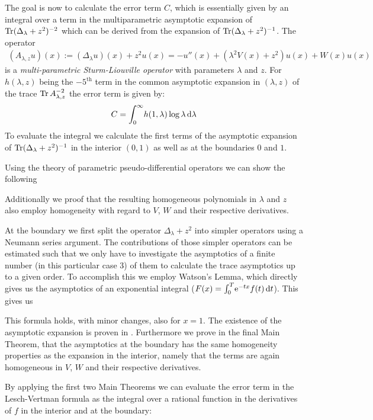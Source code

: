 The goal is now to calculate the error term $C$, which is essentially given by
an integral over a term in the multiparametric asymptotic expansion of
$\Tr(\Delta_\lambda + z^2)^{-2}$ which can be derived from the expansion of
$\Tr(\Delta_\lambda + z^2)^{-1}$. The operator
\begin{align*}
  (A_{\lambda,z}u)(x) := (\Delta_\lambda u)(x) + z^2 u(x)
           = -u''(x) + (\lambda^2 V(x) + z^2) u(x) + W(x) u(x)
\end{align*}
is a \emph{multi-parametric Sturm-Liouville operator} with parameters $\lambda$
and $z$. For $h(\lambda,z)$ being the $-5^{\text{th}}$ term in the common
asymptotic expansion in $(\lambda,z)$ of the trace $\Tr A_{\lambda,z}^{-2}$ the
error term is given by:
\begin{align*}
  C = \Integ[\infty]{0}{\lambda}{h(1,\lambda)\log\lambda}
\end{align*}
To evaluate the integral we calculate the first terms of the asymptotic
expansion of $\Tr(\Delta_\lambda + z^2)^{-1}$ in the interior $(0,1)$ as well as
at the boundaries $0$ and $1$.

Using the theory of parametric pseudo-differential operators we can show the
following
\begin{MainTheorem}
  
\end{MainTheorem}
Additionally we proof that the resulting homogeneous polynomials in $\lambda$
and $z$ also employ homogeneity with regard to $V$, $W$ and their respective
derivatives.

At the boundary we first split the operator $\Delta_\lambda + z^2$ into simpler
operators using a Neumann series argument. The contributions of those simpler
operators can be estimated such that we only have to investigate the asymptotics
of a finite number (in this particular case 3) of them to calculate the trace
asymptotics up to a given order.
%
To accomplish this we employ Watson's Lemma, which directly gives us the
asymptotics of an exponential integral ($F(x) =
\Integ[T]{0}{t}{\Eto{-tx}f(t)}$). This gives us
\begin{MainTheorem}
  
\end{MainTheorem}
This formula holds, with minor changes, also for $x=1$. The existence of the
asymptotic expansion is proven in \cite{LV13}.
%
Furthermore we prove in the final Main Theorem, that the asymptotics at the
boundary has the same homogeneity properties as the expansion in the interior,
namely that the terms are again homogeneous in $V$, $W$ and their respective
derivatives.

By applying the first two Main Theorems we can evaluate the error term in the
Lesch-Vertman formula as the integral over a rational function in the
derivatives of $f$ in the interior and at the boundary:
